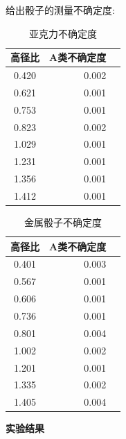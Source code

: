 \documentclass[UTF8]{gapd}
\begin{document}
给出骰子的测量不确定度:
\begin{table}[h]
	\begin{tabular}{|c|r|l}\hline
		高径比&A类不确定度	\\ \hline
		0.420&0.002\\\hline
		0.621&0.001\\\hline
		0.753&0.001\\\hline
	        0.823 &0.002\\\hline
	       1.029 &0.001\\\hline
	        1.231&0.001\\\hline
	       1.356 &0.001\\\hline
	       1.412&0.001\\\hline      
	\end{tabular}
\caption{亚克力不确定度}
\end{table}
\begin{table}[h]
	\begin{tabular}{|c|r|l}\hline
		高径比&A类不确定度	\\ \hline
		0.401&0.003\\\hline
		0.567&0.001\\\hline
		0.606&0.001\\\hline
		0.736 &0.001\\\hline
		0.801 &0.004\\\hline
		1.002&0.002\\\hline
		1.201 &0.001\\\hline
		1.335&0.002\\\hline 
		1.405&0.004\\\hline     
	\end{tabular}
	\caption{金属骰子不确定度}
\end{table}

\textbf{实验结果}
\end{document}
